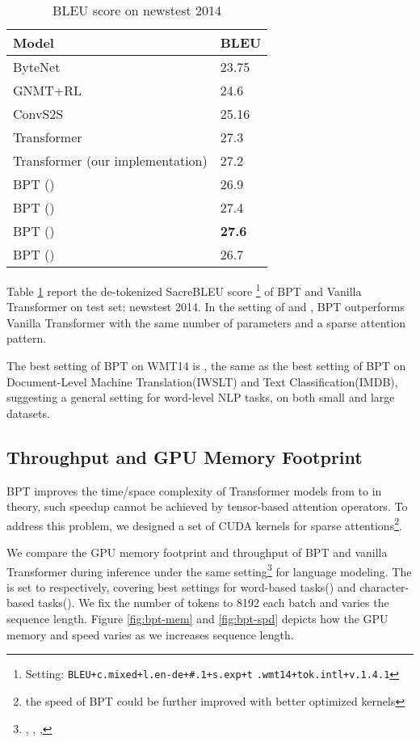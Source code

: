 \documentclass[11pt,a4paper]{article}
\begin{document}
\begin{table}[!htb]
\small
\centering
\begin{tabular}{ll}
\toprule
Model                         & BLEU  \\
\midrule
ByteNet~\cite{kalchbrenner2016neural}                       & 23.75 \\
GNMT+RL~\cite{wu2016google}                       & 24.6  \\
ConvS2S~\cite{GehringAGYD17}                     & 25.16 \\
Transformer~\cite{vaswani2017attention}       & 27.3  \\
\midrule
Transformer (our implementation) & 27.2 \\
BPT () & 26.9 \\
BPT () & 27.4 \\
BPT () & \textbf{27.6} \\
BPT () & 26.7 \\
\bottomrule
\end{tabular}
\caption{BLEU score on newstest 2014}
\label{tbl:wmt}
\end{table}

Table \ref{tbl:wmt} report the de-tokenized SacreBLEU score \footnote{Setting: \lstinline[basicstyle=\ttfamily]{BLEU+c.mixed+l.en-de+#.1+s.exp+t}
\lstinline[basicstyle=\ttfamily]{.wmt14+tok.intl+v.1.4.1}} \cite{post-2018-call} of BPT and Vanilla Transformer on test set: newstest 2014. In the setting of  and , BPT outperforms Vanilla Transformer with the same number of parameters and a sparse attention pattern.

The best setting of BPT on WMT14 is , the same as the best setting of BPT on Document-Level Machine Translation(IWSLT) and Text Classification(IMDB), suggesting  a general setting for word-level NLP tasks, on both small and large datasets.

\subsection{Throughput and GPU Memory Footprint}

\label{sec:mem}

BPT improves the time/space complexity of Transformer models from  to  in theory, such speedup cannot be achieved by tensor-based attention operators. To address this problem, we designed a set of CUDA kernels for sparse attentions\footnote{the speed of BPT could be further improved with better optimized kernels}.

We compare the GPU memory footprint and throughput of BPT and vanilla Transformer during inference under the same setting\footnote{, , , } for language modeling. The  is set to  respectively, covering best settings for word-based tasks() and character-based tasks(). We fix the number of tokens to 8192 each batch and varies the sequence length. Figure \ref{fig:bpt-mem} and \ref{fig:bpt-spd} depicts how the GPU memory and speed varies as we increases sequence length.
\end{document}
